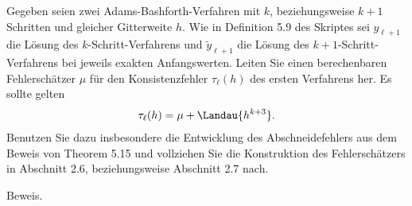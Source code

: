 \begin{exercise}
Gegeben seien zwei Adams-Bashforth-Verfahren mit $k$, beziehungsweise $k + 1$
Schritten und gleicher Gitterweite $h$. Wie in Definition 5.9 des Skriptes sei
$y_{\ell + 1}$ die Lösung des $k$-Schritt-Verfahrens und $\widetilde{y}_{\ell + 1}$
die Lösung des $k + 1$-Schritt-Verfahrens bei jeweils exakten Anfangswerten.
Leiten Sie einen berechenbaren Fehlerschätzer $\mu$ für den Konsistenzfehler $\tau_{\ell}(h)$
des ersten Verfahrens her. Es sollte gelten
\begin{align*}
  \tau_{\ell}(h) = \mu + \Landau{h^{k+3}}.
\end{align*}
Benutzen Sie dazu insbesondere die Entwicklung des Abschneidefehlers aus dem Beweis
von Theorem 5.15 und vollziehen Sie die Konstruktion des Fehlerschätzers in Abschnitt
2.6, beziehungsweise Abschnitt 2.7 nach.
\end{exercise}
\begin{solution}
Beweis.
\end{solution}
